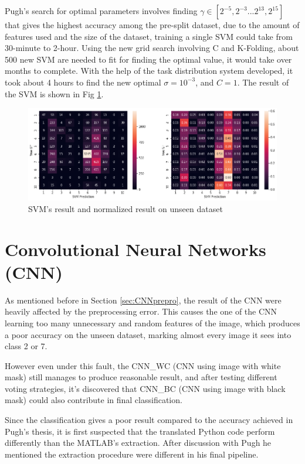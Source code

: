 \documentclass[bsc,logo,twoside,fullspacing,parskip]{infthesis}
\begin{document}
Pugh's search for optimal parameters involves finding \(\gamma\in[2^{-5},2^{-3}...2^{13},2^{15}]\) that gives the highest accuracy among the pre-split dataset, due to the amount of features used and the size of the dataset, training a single SVM could take from 30-minute to 2-hour. Using the new grid search involving C and K-Folding, about 500 new SVM are needed to fit for finding the optimal value, it would take over months to complete.
With the help of the task distribution system developed, it took about 4 hours to find the
new optimal \(\sigma = 10^{-3}\), and \(C = 1\).
The result of the SVM is shown in Fig \ref{fig:svmacc}.

\begin{figure}[h]
\centering
    \includegraphics[scale=0.44]{graph/svmresult.png}
    \caption{SVM's result and normalized result on unseen dataset}
    \label{fig:svmacc}
\end{figure} 

\section{Convolutional Neural Networks (CNN)}
\label{sec:cnn}

As mentioned before in Section \ref{sec:CNNprepro}, the result of the CNN were heavily affected by the preprocessing error. This causes the one of the CNN learning too many unnecessary and random features of the image, which produces a poor accuracy on the unseen dataset, marking almost every image it sees into class 2 or 7. 

However even under this fault, the CNN\_WC (CNN using image with white mask) still manages to produce reasonable result, and after testing different voting strategies, it's discovered that CNN\_BC (CNN using image with black mask) could also contribute in final classification.

Since the classification gives a poor result compared to the accuracy achieved in Pugh's thesis\cite{Pugh}, it is first suspected that the translated Python code perform differently than the MATLAB's extraction.
After discussion with Pugh he mentioned the extraction procedure were different in his final pipeline.
\end{document}
